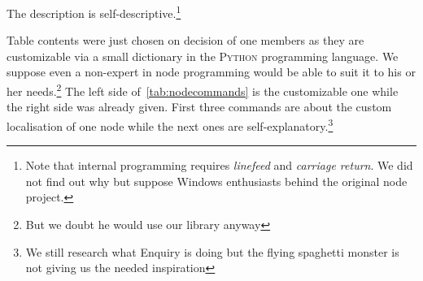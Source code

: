 The description is self-descriptive.\footnote{Note that internal programming requires \textit{linefeed} and \textit{carriage return}. We did not find out 
why but suppose Windows enthusiasts behind the original node project.}

Table contents were just chosen on decision of one members as they are customizable via a small dictionary in the \textsc{Python} programming language. We 
suppose even a non-expert in node programming would be able to suit it to his or her needs.\footnote{But we doubt he would use our library anyway}
The left side of~\ref{tab:nodecommands} is the customizable one while the right side was already given. First three commands are about the 
custom localisation of one node while the next ones are self-explanatory.\footnote{We still research what Enquiry is doing but the flying spaghetti monster is not giving us the needed inspiration}
